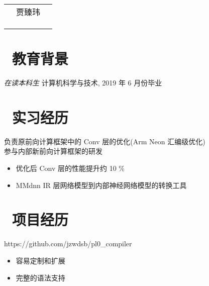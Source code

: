 \documentclass{resume}
\begin{document}

\Large{
  \begin{tabu}{ clr }
    & \scshape{贾臻玮} &  \\
    &  &  \\
    &  &  \\
    &  &  \\
  \end{tabu}
}

\section{\faGraduationCap\ 教育背景}
\textit{在读本科生} 计算机科学与技术, 2019 年 6 月份毕业

\section{\faUsers\ 实习经历}
负责原前向计算框架中的 Conv 层的优化(Arm Neon 汇编级优化) \\
参与内部新前向计算框架的研发
\begin{itemize}
  \item 优化后 Conv 层的性能提升约 10 \%
  \item MMdnn IR 层网络模型到内部神经网络模型的转换工具
\end{itemize}

\section{\faUsers\ 项目经历}
https://github.com/jzwdsb/pl0\_compiler
\begin{itemize}
  \item 容易定制和扩展
  \item 完整的语法支持
\end{itemize}
\end{document}
